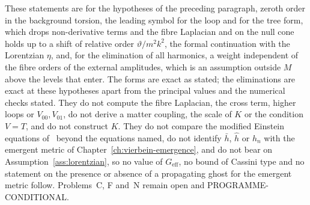 These statements are for the hypotheses of the preceding paragraph, zeroth order in the background torsion, the leading symbol for the loop and for the tree form, which drops non-derivative terms and the fibre Laplacian and on the null cone holds up to a shift of relative order \(\vartheta/m^2k^2\), the formal continuation with the Lorentzian \(\eta\), and, for the elimination of all harmonics, a weight independent of the fibre orders of the external amplitudes, which is an assumption outside \(M\) above the levels that enter. The forms are exact as stated; the eliminations are exact at these hypotheses apart from the principal values and the numerical checks stated. They do not compute the fibre Laplacian, the cross term, higher loops or \(V_{00},V_{01}\), do not derive a matter coupling, the scale of \(K\) or the condition \(V=T\), and do not construct \(K\). They do not compare the modified Einstein equations of~\cite{KumarSteinacker2023,Steinacker2026} beyond the equations named, do not identify \(\bar h\), \(\hat h\) or \(h_n\) with the emergent metric of Chapter~\ref{ch:vierbein-emergence}, and do not bear on Assumption~\ref{ass:lorentzian}, so no value of \(G_{\mathrm{eff}}\), no bound of Cassini type and no statement on the presence or absence of a propagating ghost for the emergent metric follow. Problems~C, F and~N remain open and PROGRAMME-CONDITIONAL.
